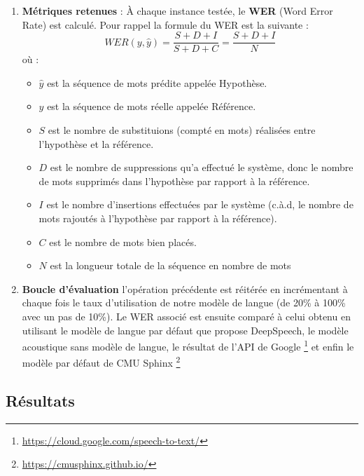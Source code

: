 \begin{enumerate}
		\item \textbf{Métriques retenues} : À chaque instance testée, le \textbf{WER} (Word Error Rate) est calculé. Pour rappel la formule du WER est la suivante :
		\begin{equation*}
			WER(y,\hat{y}) = \frac{S+D+I}{S+D+C} = \frac{S+D+I}{N}
		\end{equation*}
		où : 
		\begin{itemize}
			\item $\hat{y}$ est la séquence de mots prédite appelée Hypothèse.
			\item $y$ est la séquence de mots réelle appelée Référence.
			\item $S$ est le nombre de substituions (compté en mots) réalisées entre l'hypothèse et la référence.
			\item $D$ est le nombre de suppressions qu'a effectué le système, donc le nombre de mots supprimés dans l'hypothèse par rapport à la référence.
			\item $I$ est le nombre d'insertions effectuées par le système (c.à.d, le nombre de mots rajoutés à l'hypothèse par rapport à la référence).
			\item $C$ est le nombre de mots bien placés.
			\item $N$ est la longueur totale de la séquence en nombre de mots
		\end{itemize}
		\item \textbf{Boucle d'évaluation} l'opération précédente est réitérée en incrémentant à chaque fois le taux d'utilisation de notre modèle de langue (de 20\% à 100\% avec un pas de 10\%). Le WER associé est ensuite comparé à celui obtenu en utilisant le modèle de langue par défaut que propose DeepSpeech, le modèle acoustique sans modèle de langue, le résultat de l'API de Google \footnote{\url{https://cloud.google.com/speech-to-text/}} et enfin le modèle par défaut de CMU Sphinx \footnote{\url{https://cmusphinx.github.io/}}
		
	\end{enumerate}
	\subsection{Résultats}
